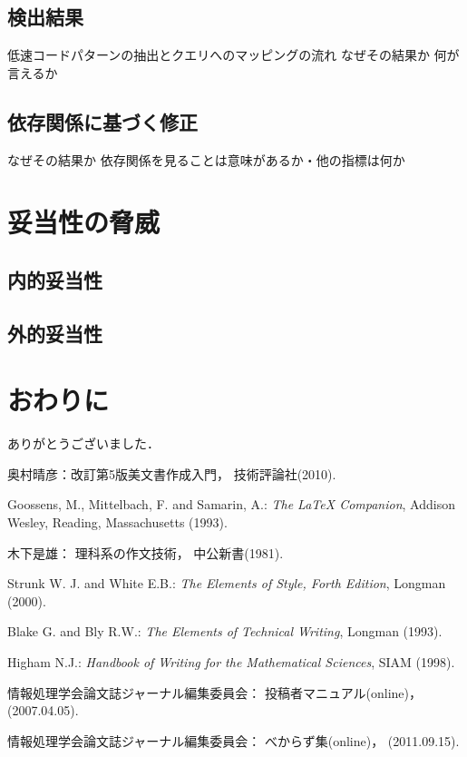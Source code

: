 \documentclass[submit,techrep,noauthor]{ipsj}
\begin{document}
\subsection{検出結果}

低速コードパターンの抽出とクエリへのマッピングの流れ
なぜその結果か
何が言えるか

\subsection{依存関係に基づく修正}

なぜその結果か
依存関係を見ることは意味があるか・他の指標は何か

\section{妥当性の脅威}
\label{sec6:format}

\subsection{内的妥当性}


\subsection{外的妥当性}


\section{おわりに}
\label{sec7:format}


\begin{acknowledgment}
ありがとうございました．
\end{acknowledgment}



\begin{thebibliography}{10}

奥村晴彦：改訂第5版\LaTeXe 美文書作成入門，
技術評論社(2010).

Goossens, M., Mittelbach, F. and Samarin, A.:
{\it The LaTeX Companion},
Addison Wesley, Reading, Massachusetts (1993).

木下是雄：
理科系の作文技術，
中公新書(1981).

Strunk W. J. and White E.B.:
{\it The Elements of Style, Forth Edition},
Longman (2000).

Blake G. and Bly R.W.:
{\it The Elements of Technical Writing},
Longman (1993).

Higham N.J.:
{\it Handbook of Writing for the Mathematical Sciences},
SIAM (1998).

情報処理学会論文誌ジャーナル編集委員会：
投稿者マニュアル(online)，
(2007.04.05).

情報処理学会論文誌ジャーナル編集委員会：
べからず集(online)，
(2011.09.15).

\end{thebibliography}
\end{document}

